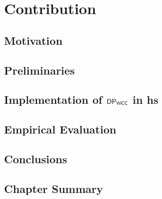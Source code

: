 \chapter{Contribution}
\section{Motivation}
\section{Preliminaries}
\section{Implementation of $\mathsf{DP_{WCC}}$ in \acrshort{hs}}
\section{Empirical Evaluation}
\section{Conclusions}
\section{Chapter Summary}


